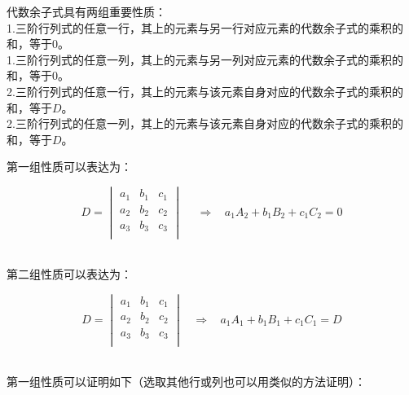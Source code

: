 \documentclass[UTF8]{ctexart}
\begin{document}
    代数余子式具有两组重要性质：\\[3mm]
    1.三阶行列式的任意一行，其上的元素与另一行对应元素的代数余子式的乘积的和，等于$0$。\\[3mm]
    1.三阶行列式的任意一列，其上的元素与另一列对应元素的代数余子式的乘积的和，等于$0$。\\[3mm]
    2.三阶行列式的任意一行，其上的元素与该元素自身对应的代数余子式的乘积的和，等于$D$。\\[3mm]
    2.三阶行列式的任意一列，其上的元素与该元素自身对应的代数余子式的乘积的和，等于$D$。\\[3mm]

\newpage

    第一组性质可以表达为：
    \begin{large}
        \begin{equation*}
            D=
            \begin{vmatrix}
                a_1&b_1&c_1\\
                a_2&b_2&c_2\\
                a_3&b_3&c_3\\
            \end{vmatrix}
            ~~~~~~\Longrightarrow~~~~
            a_1A_2+b_1B_2+c_1C_2=0
        \end{equation*}
    \end{large}\\[2mm]
    第二组性质可以表达为：
    \begin{large}
        \begin{equation*}
            D=
            \begin{vmatrix}
                a_1&b_1&c_1\\
                a_2&b_2&c_2\\
                a_3&b_3&c_3\\
            \end{vmatrix}
            ~~~~\Longrightarrow~~~~
            a_1A_1+b_1B_1+c_1C_1=D
        \end{equation*}
    \end{large}\\[2mm]
    第一组性质可以证明如下（选取其他行或列也可以用类似的方法证明）：\vspace{5pt}
    \setcounter{equation}{0}
\end{document}
